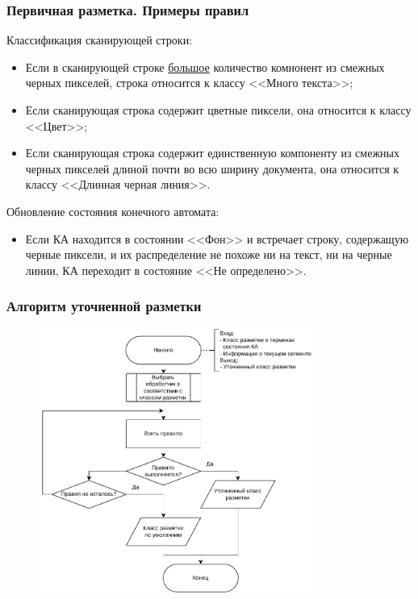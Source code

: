 \documentclass[gray]{beamer}
\begin{document}
\begin{frame}
    \frametitle{Первичная разметка. Примеры правил}
    Классификация сканирующей строки:
    \begin{itemize}
        \item Если в сканирующей строке \underline{большое} количество комнонент из смежных черных пикселей, строка относится к классу <<Много текста>>;
        \item Если сканирующая строка содержит цветные пиксели, она относится к классу <<Цвет>>;
        \item Если сканирующая строка содержит единственную компоненту из смежных черных пикселей длиной почти во всю ширину документа, она относится к классу <<Длинная черная линия>>.
    \end{itemize}

    Обновление состояния конечного автомата:
    \begin{itemize}
        \item Если КА находится в состоянии <<Фон>> и встречает строку, содержащую черные пиксели, и их распределение не похоже ни на текст, ни на черные линии, КА переходит в состояние <<Не определено>>.
    \end{itemize}
\end{frame}

\begin{frame}
    \frametitle{Алгоритм уточненной разметки}
    \begin{figure}[H]
        \centering
        \includegraphics[width=0.8\textwidth]{diag/specified.pdf}
    \end{figure}
\end{frame}
\end{document}
